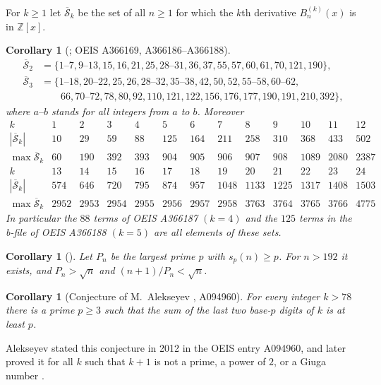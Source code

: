 \documentclass[11pt]{amsart}
\newtheorem{corollary}[theorem]{Corollary}
\theoremstyle{remark}
\numberwithin{equation}{section}
\newcommand{\ZZ}{\mathbb Z}
\newcommand{\Sb}{\overline{\mathcal S}}
\begin{document}
For $k\ge1$ let $\Sb_k$ be the set of all $n\ge1$ for which the $k$th derivative $B_n^{(k)}(x)$ is in $\ZZ[x]$.

\begin{corollary}[{\cite[Conjecture 15]{K24}; OEIS A366169, A366186--A366188}]\label{cor:higher}
\begin{align*}
\Sb_2&=\{1\text{--}7,9\text{--}13,15,16,21,25,28\text{--}31,36,37,55,57,60,61,70,121,190\},\\
\Sb_3&=\{1\text{--}18,20\text{--}22,25,26,28\text{--}32,35\text{--}38,42,50,52,55\text{--}58,60\text{--}62,\\
&\qquad66,70\text{--}72,78,80,92,110,121,122,156,176,177,190,191,210,392\},
\end{align*}
where $a\text{--}b$ stands for all integers from $a$ to $b$. Moreover
\[
\begin{array}{c|cccccccccccc}
k&1&2&3&4&5&6&7&8&9&10&11&12\\ \hline
|\Sb_k|&10&29&59&88&125&164&211&258&310&368&433&502\\
\max\Sb_k&60&190&392&393&904&905&906&907&908&1089&2080&2387\\[6pt]
k&13&14&15&16&17&18&19&20&21&22&23&24\\ \hline
|\Sb_k|&574&646&720&795&874&957&1048&1133&1225&1317&1408&1503\\
\max\Sb_k&2952&2953&2954&2955&2956&2957&2958&3763&3764&3765&3766&4775
\end{array}
\]
In particular the $88$ terms of OEIS A366187 $(k=4)$ and the $125$ terms in the b-file of OEIS A366188 $(k=5)$ are all elements of
these sets.
\end{corollary}

\begin{corollary}[{\cite[Conjecture 1]{K17}}]\label{cor:K17}
Let $P_n$ be the largest prime $p$ with $s_p(n)\ge p$. For $n>192$ it exists, and $P_n>\sqrt n$ and $(n+1)/P_n<\sqrt n$.
\end{corollary}

\begin{corollary}[Conjecture of M.~Alekseyev \cite{OEIS}, A094960]\label{cor:alek}
For every integer $k>78$ there is a prime $p\ge3$ such that the sum of the last two base-$p$ digits of $k$ is at least $p$.
\end{corollary}

Alekseyev stated this conjecture in 2012 in the OEIS entry A094960, and later proved it for all $k$ such that $k+1$ is not a prime,
a power of $2$, or a Giuga number \cite{OEIS}.
\end{document}
